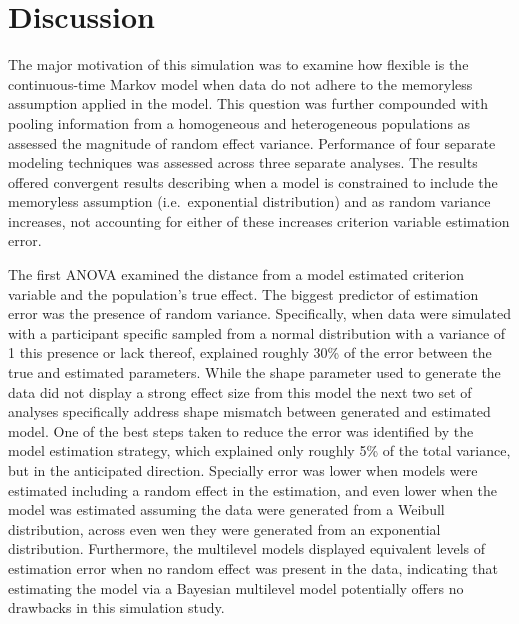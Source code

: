 \documentclass[12pt]{./styles/outhesis}
\begin{document}
\newpage

\section{Discussion}\label{discussion}

The major motivation of this simulation was to examine how flexible is
the continuous-time Markov model when data do not adhere to the
memoryless assumption applied in the model. This question was further
compounded with pooling information from a homogeneous and heterogeneous
populations as assessed the magnitude of random effect variance.
Performance of four separate modeling techniques was assessed across
three separate analyses. The results offered convergent results
describing when a model is constrained to include the memoryless
assumption (i.e.~exponential distribution) and as random variance
increases, not accounting for either of these increases criterion
variable estimation error.

The first ANOVA examined the distance from a model estimated criterion
variable and the population's true effect. The biggest predictor of
estimation error was the presence of random variance. Specifically, when
data were simulated with a participant specific sampled from a normal
distribution with a variance of 1 this presence or lack thereof,
explained roughly 30\% of the error between the true and estimated
parameters. While the shape parameter used to generate the data did not
display a strong effect size from this model the next two set of
analyses specifically address shape mismatch between generated and
estimated model. One of the best steps taken to reduce the error was
identified by the model estimation strategy, which explained only
roughly 5\% of the total variance, but in the anticipated direction.
Specially error was lower when models were estimated including a random
effect in the estimation, and even lower when the model was estimated
assuming the data were generated from a Weibull distribution, across
even wen they were generated from an exponential distribution.
Furthermore, the multilevel models displayed equivalent levels of
estimation error when no random effect was present in the data,
indicating that estimating the model via a Bayesian multilevel model
potentially offers no drawbacks in this simulation study.
\end{document}
